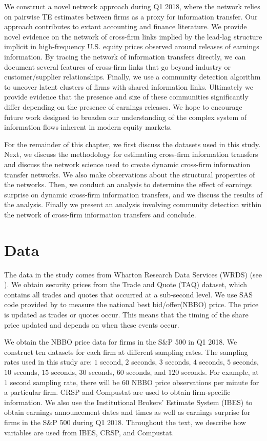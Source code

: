 We construct a novel network approach during Q1 2018,  where the network relies on pairwise TE estimates between firms as a proxy for information transfer. Our approach contributes to extant accounting and finance literature.  We provide novel evidence on the network of cross-firm links implied by the lead-lag structure implicit in high-frequency U.S. equity prices observed around releases of earnings information.  By tracing the network of information transfers directly,  we can document several features of cross-firm links that go beyond industry or customer/supplier relationships.  Finally,  we use a community detection algorithm to uncover latent clusters of firms with shared information links.  Ultimately we provide evidence that the presence and size of these communities significantly differ depending on the presence of earnings releases.  We hope to encourage future work designed to broaden our understanding of the complex system of information flows inherent in modern equity markets. 

For the remainder of this chapter,  we first discuss the datasets used in this study.   Next, we discuss the methodology for estimating cross-firm information transfers and discuss the network science used to create dynamic cross-firm information transfer networks. We also make observations about the structural properties of the networks.  Then, we conduct an analysis to determine the effect of earnings surprise on dynamic cross-firm information transfers, and we discuss the results of the analysis.  Finally we present an analysis involving community detection within the network of cross-firm  information transfers and conclude.

\section{Data}
The data in the study comes from Wharton Research Data Services (WRDS) (see \cite{WRDS}). We obtain security prices from the Trade and Quote (TAQ) dataset, which contains all trades and quotes that occurred at a sub-second level.  We use SAS code provided by \cite{HoldenJacobsen2014} to measure the national best bid/offer(NBBO) price. The price is updated as trades or quotes occur.  This means that the timing of the share price updated and depends on when these events occur.  %

We obtain the NBBO price data for firms in the S\&P 500 in Q1 2018.  We construct ten datasets for each firm at different sampling rates. The sampling rates used in this study are: $1$ second,  $2$ seconds,  $3$ seconds,  $4$ seconds,  $5$ seconds, $10$ seconds,  $15$ seconds,  $30$ seconds,  $60$ seconds,  and $120$ seconds.  For example, at $1$ second sampling rate, there will be 60 NBBO price observations per minute for a particular firm.  CRSP and Compustat are used to obtain firm-specific information.  We also use the Institutional Brokers' Estimate System (IBES) to obtain earnings announcement dates and times as well as earnings surprise for firms in the S\&P 500 during Q1 2018.  Throughout the text, we describe how variables are used from IBES, CRSP, and Compustat. 

